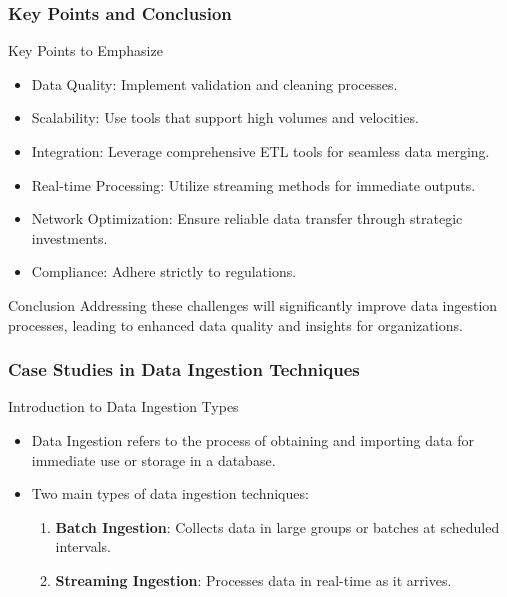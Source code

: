 \documentclass[aspectratio=169]{beamer}
\begin{document}
\begin{frame}[fragile]
    \frametitle{Key Points and Conclusion}
    \begin{block}{Key Points to Emphasize}
        \begin{itemize}
            \item Data Quality: Implement validation and cleaning processes.
            \item Scalability: Use tools that support high volumes and velocities.
            \item Integration: Leverage comprehensive ETL tools for seamless data merging.
            \item Real-time Processing: Utilize streaming methods for immediate outputs.
            \item Network Optimization: Ensure reliable data transfer through strategic investments.
            \item Compliance: Adhere strictly to regulations.
        \end{itemize}
    \end{block}
    \begin{block}{Conclusion}
        Addressing these challenges will significantly improve data ingestion processes, leading to enhanced data quality and insights for organizations.
    \end{block}
\end{frame}

\begin{frame}[fragile]
    \frametitle{Case Studies in Data Ingestion Techniques}
    \begin{block}{Introduction to Data Ingestion Types}
        \begin{itemize}
            \item Data Ingestion refers to the process of obtaining and importing data for immediate use or storage in a database.
            \item Two main types of data ingestion techniques:
                \begin{enumerate}
                    \item \textbf{Batch Ingestion}: Collects data in large groups or batches at scheduled intervals.
                    \item \textbf{Streaming Ingestion}: Processes data in real-time as it arrives.
                \end{enumerate}
        \end{itemize} 
    \end{block}
\end{frame}
\end{document}
